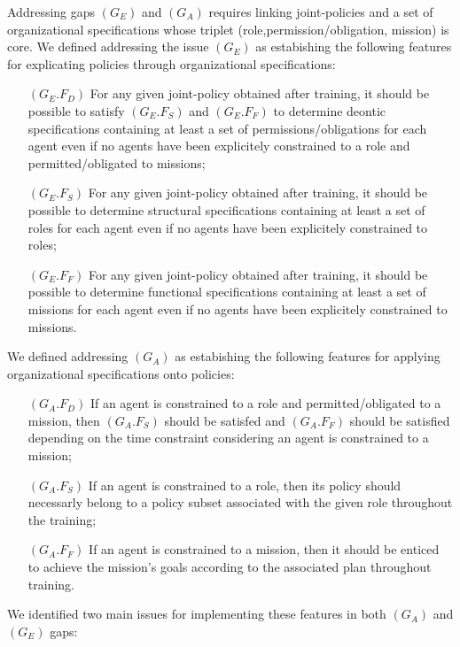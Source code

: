 \documentclass[runningheads]{llncs}
\begin{document}
Addressing gaps $(G_E)$ and $(G_A)$ requires linking joint-policies and a set of organizational specifications whose triplet (role,permission/obligation, mission) is core. We defined addressing the issue $(G_E)$ as estabishing the following features for explicating policies through organizational specifications:
%
\begin{itemize}[wide, labelsep = 1em]
    \item[$(G_E.F_D)$] For any given joint-policy obtained after training, it should be possible to satisfy $(G_E.F_S)$ and $(G_E.F_F)$ to determine deontic specifications containing at least a set of permissions/obligations for each agent even if no agents have been explicitely constrained to a role and permitted/obligated to missions;
    \item[$(G_E.F_S)$] For any given joint-policy obtained after training, it should be possible to determine structural specifications containing at least a set of  roles for each agent even if no agents have been explicitely constrained to roles;
    \item[$(G_E.F_F)$] For any given joint-policy obtained after training, it should be possible to determine functional specifications containing at least a set of  missions for each agent even if no agents have been explicitely constrained to missions.
\end{itemize}

\noindent We defined addressing $(G_A)$ as estabishing the following features for applying organizational specifications onto policies:
%
\begin{itemize}[wide, labelsep = 1em]
    \item[$(G_A.F_D)$] If an agent is constrained to a role and permitted/obligated to a mission, then $(G_A.F_S)$ should be satisfed and $(G_A.F_F)$ should be satisfied depending on the time constraint considering an agent is constrained to a mission;
    \item[$(G_A.F_S)$] If an agent is constrained to a role, then its policy should necessarly belong to a policy subset associated with the given role throughout the training;
    \item[$(G_A.F_F)$] If an agent is constrained to a mission, then it should be enticed to achieve the mission's goals according to the associated plan throughout training.
\end{itemize}

\noindent We identified two main issues for implementing these features in both $(G_A)$ and $(G_E)$ gaps:
\end{document}
